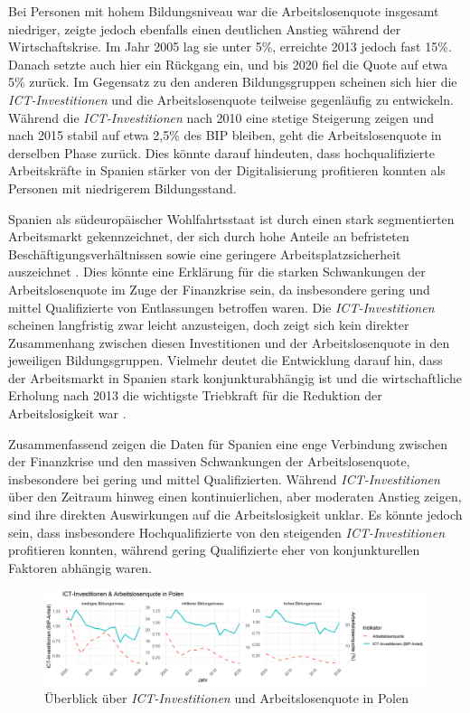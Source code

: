 Bei Personen mit hohem Bildungsniveau war die Arbeitslosenquote insgesamt niedriger, 
zeigte jedoch ebenfalls einen deutlichen Anstieg während der Wirtschaftskrise. Im Jahr 
2005 lag sie unter 5\%, erreichte 2013 jedoch fast 15\%. Danach setzte auch hier ein 
Rückgang ein, und bis 2020 fiel die Quote auf etwa 5\% zurück. Im Gegensatz zu den 
anderen Bildungsgruppen scheinen sich hier die \textit{\ac{ICT}-Investitionen} und 
die Arbeitslosenquote teilweise gegenläufig zu entwickeln. Während die 
\textit{\ac{ICT}-Investitionen} nach 2010 eine stetige Steigerung zeigen und nach 
2015 stabil auf etwa 2,5\% des BIP bleiben, geht die Arbeitslosenquote in derselben 
Phase zurück. Dies könnte darauf hindeuten, dass hochqualifizierte Arbeitskräfte in 
Spanien stärker von der Digitalisierung profitieren konnten als Personen mit 
niedrigerem Bildungsstand.

Spanien als südeuropäischer Wohlfahrtsstaat ist durch einen stark segmentierten 
Arbeitsmarkt gekennzeichnet, der sich durch hohe Anteile an befristeten 
Beschäftigungsverhältnissen sowie eine geringere Arbeitsplatzsicherheit auszeichnet 
\parencite[vgl.][159–160]{bentolila2012two}. Dies könnte eine Erklärung für die starken 
Schwankungen der Arbeitslosenquote im Zuge der Finanzkrise sein, da insbesondere 
gering und mittel Qualifizierte von Entlassungen betroffen waren. Die 
\textit{\ac{ICT}-Investitionen} scheinen langfristig zwar leicht anzusteigen, doch zeigt 
sich kein direkter Zusammenhang zwischen diesen Investitionen und der Arbeitslosenquote 
in den jeweiligen Bildungsgruppen. Vielmehr deutet die Entwicklung darauf hin, dass der 
Arbeitsmarkt in Spanien stark konjunkturabhängig ist und die wirtschaftliche Erholung 
nach 2013 die wichtigste Triebkraft für die Reduktion der Arbeitslosigkeit war 
\parencite[vgl.][157–159]{bentolila2012two}.

Zusammenfassend zeigen die Daten für Spanien eine enge Verbindung zwischen der 
Finanzkrise und den massiven Schwankungen der Arbeitslosenquote, insbesondere bei 
gering und mittel Qualifizierten. Während \textit{\ac{ICT}-Investitionen} über den 
Zeitraum hinweg einen kontinuierlichen, aber moderaten Anstieg zeigen, sind ihre 
direkten Auswirkungen auf die Arbeitslosigkeit unklar. Es könnte jedoch sein, dass 
insbesondere Hochqualifizierte von den steigenden \textit{\ac{ICT}-Investitionen} 
profitieren konnten, während gering Qualifizierte eher von konjunkturellen 
Faktoren abhängig waren.

\begin{figure}[htbp]
    \centering
    \includegraphics[width=\textwidth]{assets/plot_poland_final.png}
    \caption{Überblick über \textit{\ac{ICT}-Investitionen} und Arbeitslosenquote 
    in Polen}
    \label{fig:poland}
\end{figure}

